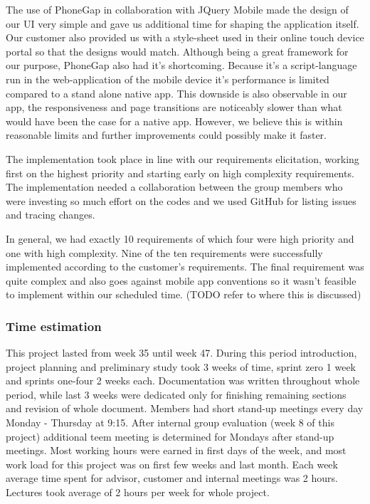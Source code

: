 The use of PhoneGap in collaboration with JQuery Mobile made the design of our UI very simple and gave us additional time for shaping the application itself.
Our customer also provided us with a style-sheet used in their online touch device portal so that the designs would match.
Although being a great framework for our purpose, PhoneGap also had it's shortcoming.
Because it's a script-language run in the web-application of the mobile device it's performance is limited compared to a stand alone native app.
This downside is also observable in our app, the responsiveness and page transitions are noticeably slower than what would have been the case for a native app.
However, we believe this is within reasonable limits and further improvements could possibly make it faster.

The implementation took place in line with our requirements elicitation, working first on the highest priority and starting early on high complexity requirements.
The implementation needed a collaboration between the group members who were investing so much effort on the codes and we used GitHub for listing issues and tracing changes.

In general, we had exactly 10 requirements of which four were high priority and one with high complexity.
Nine of the ten requirements were successfully implemented according to the customer's requirements.
The final requirement was quite complex and also goes against mobile app conventions so it wasn't feasible to implement within our scheduled time. (TODO refer to where this is discussed)

	\subsubsection{Time estimation}
	This project lasted from week 35 until week 47. During this period introduction, project planning and preliminary study took 3 weeks of time, sprint zero 1 week and sprints one-four 2 weeks each. Documentation was written throughout whole period, while last 3 weeks were dedicated only for finishing remaining sections and revision of whole document.\newline
	Members had short stand-up meetings every day Monday - Thursday at 9:15. After internal group evaluation (week 8 of this project) additional teem meeting is determined for Mondays after stand-up meetings. Most working hours were earned in first days of the week, and most work load for this project was on first few weeks and last month.\newline	
	Each week average time spent for advisor, customer and internal meetings was 2 hours. Lectures took average of 2 hours per week for whole project.
	

